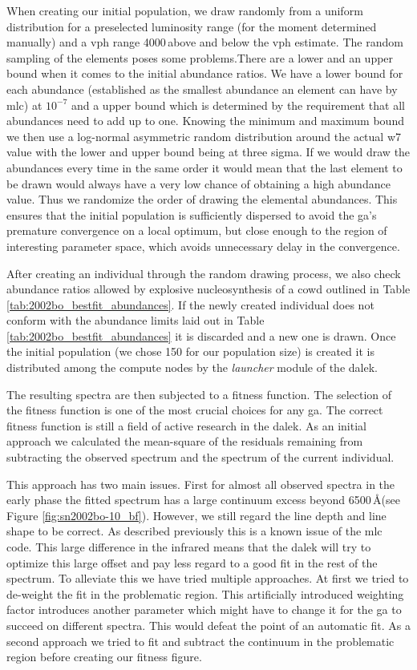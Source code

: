 When creating our initial population, we draw randomly from a uniform distribution for a preselected luminosity range (for the moment determined manually) and a \gls{vph} range 4000\,\kms above and below the \gls{vph} estimate. The random sampling of the elements poses some problems.There are a lower and an upper bound when it comes to the initial abundance ratios. We have a lower bound for each abundance (established as the smallest abundance an element can have by \gls{mlc}) at $10^{-7}$ and a upper bound which is determined by the requirement that all abundances need to add up to one. Knowing the minimum and maximum bound we then use a log-normal asymmetric random distribution around the actual \gls{w7} value with the lower and upper bound being at three sigma. If we would draw the abundances every time in the same order it would mean that the last element to be drawn would always have a very low chance of obtaining a high abundance value. Thus we randomize the order of drawing the elemental abundances. This ensures that the initial population is sufficiently dispersed to avoid the \gls{ga}'s premature convergence on a local optimum, but close enough to the region of interesting parameter space, which avoids unnecessary delay in the convergence. 

After creating an individual through the random drawing process, we also check abundance ratios allowed by explosive nucleosynthesis of a \gls{cowd} outlined in Table \ref{tab:2002bo_bestfit_abundances}. If the newly created individual does not conform with the abundance limits laid out in Table \ref{tab:2002bo_bestfit_abundances} it is discarded and a new one is drawn. Once the initial population (we chose 150 for our population size) is created it is distributed among the compute nodes by the \emph{launcher} module of the \gls{dalek}.

The resulting spectra are then subjected to a fitness function. The selection of the fitness function is one of the most crucial choices for any \gls{ga}. The correct fitness function is still a field of active research in the \gls{dalek}. As an initial approach we calculated the mean-square of the residuals remaining from subtracting the observed spectrum and the spectrum of the current individual. 

This approach has two main issues. First for almost all observed spectra in the early phase the fitted spectrum has a large continuum excess beyond 6500\,\AA (see Figure \ref{fig:sn2002bo-10_bf}). However, we still regard the line depth and line shape to be correct. As described previously this is a known issue of the \gls{mlc} code. This large difference in the infrared means that the \gls{dalek} will try to optimize this large offset and pay less regard to a good fit in the rest of the spectrum. To alleviate this we have tried multiple approaches. At first we tried to de-weight the fit in the problematic region. This artificially introduced weighting factor introduces another parameter which might have to change it for the \gls{ga} to succeed on different spectra. This would defeat the point of an automatic fit. As a second approach we tried to fit and subtract the continuum in the problematic region before creating our fitness figure. 

